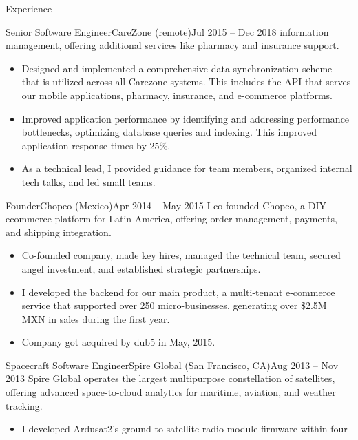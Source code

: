 \documentclass[colibri]{mcdowellcv}
\begin{document}
\begin{cvsection}{Experience}
\begin{cvsubsection}{Senior Software Engineer}{CareZone (remote)}{Jul 2015 -- Dec 2018}
    information management, offering additional services like pharmacy and insurance
    support.
    \newline
		\begin{itemize}
    \item
      Designed and implemented a comprehensive data synchronization scheme that is
      utilized across all Carezone systems. This includes the API that serves our
      mobile applications, pharmacy, insurance, and e-commerce platforms.
    \item
      Improved application performance by identifying and addressing performance
      bottlenecks, optimizing database queries and indexing. This improved
      application response times by 25\%.
    \item
      As a technical lead, I provided guidance for team members, organized
      internal tech talks, and led small teams.
		\end{itemize}
	\end{cvsubsection}
	\begin{cvsubsection}{Founder}{Chopeo (Mexico)}{Apr 2014 -- May 2015}
    I co-founded Chopeo, a DIY ecommerce platform for Latin America, offering
    order management, payments, and shipping integration.
    \newline
		\begin{itemize}
    \item
      Co-founded company, made key hires, managed the technical team, secured
      angel investment, and established strategic partnerships.
    \item
      I developed the backend for our main product, a multi-tenant e-commerce service
      that supported over 250 micro-businesses, generating over \$2.5M MXN in
      sales during the first year.
    \item
      Company got acquired by dub5 in May, 2015.
		\end{itemize}
	\end{cvsubsection}
	\begin{cvsubsection}{Spacecraft Software Engineer}{Spire Global (San Francisco, CA)}{Aug 2013 -- Nov 2013}
    Spire Global operates the largest multipurpose constellation of satellites,
    offering advanced space-to-cloud analytics for maritime, aviation, and weather
    tracking.
    \newline
    \begin{itemize}
    \item
      I developed Ardusat2's ground-to-satellite radio module firmware within four

\end{itemize}
\end{cvsubsection}
\end{cvsection}
\end{document}
